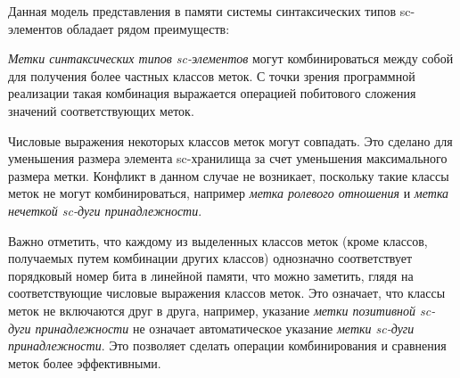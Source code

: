 Данная модель представления в памяти системы синтаксических типов sc-элементов обладает рядом преимуществ:
\begin{scnitemize}
    \item \textit{Метки синтаксических типов sc-элементов} могут комбинироваться между собой для получения более
    частных классов меток. С точки зрения программной реализации такая комбинация выражается операцией побитового
    сложения значений соответствующих меток.
    \item Числовые выражения некоторых классов меток могут совпадать. Это сделано для уменьшения размера элемента
    sc-хранилища за счет уменьшения максимального размера метки. Конфликт в данном случае не возникает, поскольку такие
    классы меток не могут комбинироваться, например \textit{метка ролевого отношения} и
    \textit{метка нечеткой sc-дуги принадлежности}.
    \item Важно отметить, что каждому из выделенных классов меток (кроме классов, получаемых путем комбинации других
    классов) однозначно соответствует порядковый номер бита в линейной памяти, что можно заметить, глядя на
    соответствующие числовые выражения классов меток. Это означает, что классы меток не включаются друг в друга, например,
    указание \textit{метки позитивной sc-дуги принадлежности} не означает автоматическое указание \textit{метки sc-дуги
    принадлежности}. Это позволяет сделать операции комбинирования и сравнения меток более эффективными.
\end{scnitemize}

